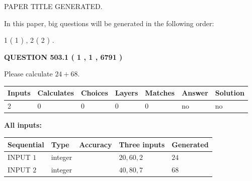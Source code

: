 \documentclass[12pt]{article}
\begin{document}
   
\vspace{0.2in}
   
   
   
   
   
   
   
   
 \vspace{0.2in}
 
 
 
 
   
   
 PAPER TITLE GENERATED.
   
   
   
\vspace{0.2in}
   
In this paper, big questions will be generated in the following order: 
   
   
   1 ( 1 )
 ,
   2 ( 2 )
 .
  
\vspace{0.2in}
  
{\textbf{\Large{QUESTION
503.1 
 ( 1 , 1 , 6791 )
}}}
  
  
 
Please calculate $ %
24 +  %
68 $.
 
 
   
   
   
   
\noindent\begin{tabular}{|l|l|l|l|l|l|l|}
 \hline
Inputs & Calculates & Choices & Layers & Matches & Answer & Solution \\ \hline
 2  & 
 0  & 
 0
  & 
 0  & 
 0  & 
  no & 
  no 
  \\ \hline
 \end{tabular}
   
   
   
   
\noindent{}
   
   
   
   
\noindent\vspace{0.1in}\hspace{-0.08in} {\textbf{\Large{All inputs: }}}
   
   
  
  
\noindent\begin{tabular}{|l|l|l|l|l|}
\hline
 Sequential & Type & Accuracy & Three inputs & Generated \\ 
\hline
 
 
  INPUT $  1 $ & integer &  & $
 20
 , 
 60
 , 
 2
 $ & $ 24 $ 
 \\  \hline  
 
 
  INPUT $  2 $ & integer &  & $
 40
 , 
 80
 , 
 7
 $ & $ 68 $ 
 \\  \hline  
 \end{tabular}
   
\end{document}
